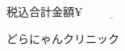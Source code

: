 \documentclass[b6paper]{jsarticle}
\begin{document}
\vspace{-20pt}

\flushright
\hspace{100pt}税込合計金額$\underline{\yen \hspace{70pt}}$
\vspace{5pt}

\hspace{150pt}どらにゃんクリニック
\end{document}
